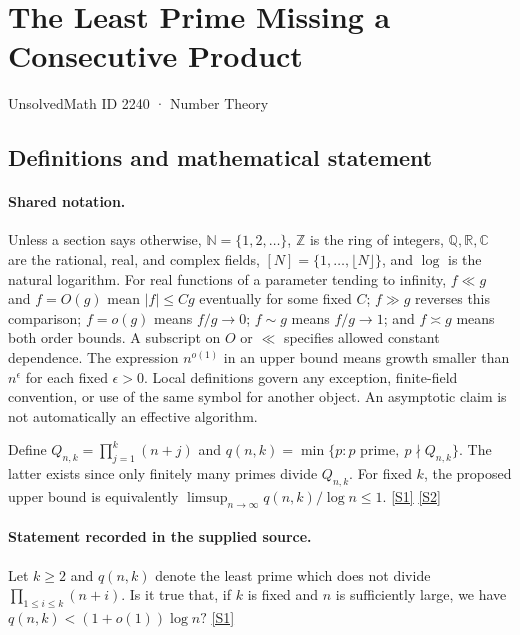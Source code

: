 \documentclass[11pt,a4paper]{article}
\newcommand{\N}{\mathbb{N}}
\newcommand{\Z}{\mathbb{Z}}
\newcommand{\Q}{\mathbb{Q}}
\newcommand{\R}{\mathbb{R}}
\newcommand{\C}{\mathbb{C}}
\newcommand{\sref}[2]{\hyperlink{source:#1:#2}{[S#2]}}
\begin{document}

\setcounter{section}{2239}

\section{The Least Prime Missing a Consecutive Product}\label{2240}

{\small\sffamily UnsolvedMath ID 2240 · Number Theory}

\subsection{Definitions and mathematical statement}

\paragraph{Shared notation.}Unless a section says otherwise, $\N=\{1,2,\ldots\}$,
$\Z$ is the ring of integers, $\Q,\R,\C$ are the rational, real, and complex
fields, $[N]=\{1,\ldots,\lfloor N\rfloor\}$, and $\log$ is the natural
logarithm. For real functions of a parameter tending to infinity,
$f\ll g$ and $f=O(g)$ mean $|f|\leq Cg$ eventually for some fixed $C$;
$f\gg g$ reverses this comparison; $f=o(g)$ means $f/g\to0$;
$f\sim g$ means $f/g\to1$; and $f\asymp g$ means both order bounds.
A subscript on $O$ or $\ll$ specifies allowed constant dependence.
The expression $n^{o(1)}$ in an upper bound means growth smaller than
$n^\epsilon$ for each fixed $\epsilon>0$. Local definitions govern any
exception, finite-field convention, or use of the same symbol for another
object. An asymptotic claim is not automatically an effective algorithm.



Define $Q_{n,k}=\prod_{j=1}^{k}(n+j)$ and $q(n,k)=\min\{p:p\text{ prime},\ p\nmid Q_{n,k}\}$. The latter exists since only finitely many primes divide $Q_{n,k}$. For fixed $k$, the proposed upper bound is equivalently $\limsup_{n\to\infty}q(n,k)/\log n\leq1$. \sref{2240}{1} \sref{2240}{2}

\paragraph{Statement recorded in the supplied source.}
Let $k\geq 2$ and $q(n,k)$ denote the least prime which does not divide $\prod_{1\leq i\leq k}(n+i)$. Is it true that, if $k$ is fixed and $n$ is sufficiently large, we have $ q(n,k)<(1+o(1))\log n? $ \sref{2240}{1}
\end{document}
